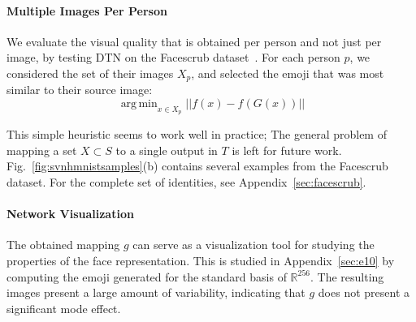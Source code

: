\documentclass{article} %
\DeclareMathOperator*{\argmin}{arg\,min}
\begin{document}
\paragraph{Multiple Images Per Person} We evaluate the visual quality that is obtained per person and not just per image, by testing DTN on the Facescrub dataset~\citep{facescrub}. For each person $p$, we considered the set of their images $X_p$, and  selected the emoji that was most similar to their source image:
\begin{equation}
\label{eq:mmeq}
\argmin_{x \in X_p} || f(x)-f(G(x))|| 
\end{equation}

This simple heuristic seems to work well in practice; The general problem of mapping a set $X \subset S$ to a single output in $T$ is left for future work.  Fig.~\ref{fig:svnhmnistsamples}(b) contains several examples from the Facescrub dataset. For the complete set of identities, see Appendix~\ref{sec:facescrub}.

\paragraph{Network Visualization} The obtained mapping $g$ can serve as a visualization tool for studying the properties of the face representation. This is studied in Appendix~\ref{sec:e10} by computing the emoji generated for the standard basis of $\mathbb{R}^{256}$. The resulting images present a large amount of variability, indicating that $g$ does not present a significant mode effect.
\end{document}
